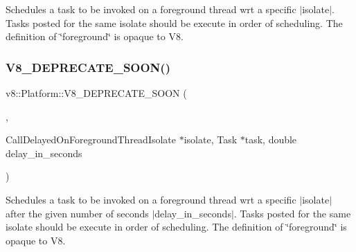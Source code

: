 Schedules a task to be invoked on a foreground thread wrt a specific $\vert$isolate$\vert$. Tasks posted for the same isolate should be execute in order of scheduling. The definition of \char`\"{}foreground\char`\"{} is opaque to V8. \mbox{\label{classv8_1_1Platform_a7bdd7f9f31ce5fe5c5f0fd8a0e597d04}} 
\subsubsection{\texorpdfstring{V8\+\_\+\+D\+E\+P\+R\+E\+C\+A\+T\+E\+\_\+\+S\+O\+O\+N()}{V8\_DEPRECATE\_SOON()}\hspace{0.1cm}{\footnotesize\ttfamily [2/3]}}
{\footnotesize\ttfamily v8\+::\+Platform\+::\+V8\+\_\+\+D\+E\+P\+R\+E\+C\+A\+T\+E\+\_\+\+S\+O\+ON (\begin{DoxyParamCaption}\item[{\char`\"{}Use a taskrunner acquired by \mbox{\hyperlink{classv8_1_1Platform_af0d18c6bbefa133c5d11ec8a460d0278}{Get\+Foreground\+Task\+Runner}} instead.\char`\"{}}]{,  }\item[{virtual void }]{Call\+Delayed\+On\+Foreground\+ThreadIsolate $\ast$isolate, Task $\ast$task, double delay\+\_\+in\+\_\+seconds }\end{DoxyParamCaption})\hspace{0.3cm}{\ttfamily [pure virtual]}}

Schedules a task to be invoked on a foreground thread wrt a specific $\vert$isolate$\vert$ after the given number of seconds $\vert$delay\+\_\+in\+\_\+seconds$\vert$. Tasks posted for the same isolate should be execute in order of scheduling. The definition of \char`\"{}foreground\char`\"{} is opaque to V8. \mbox{\label{classv8_1_1Platform_a2164bf101f39010ec95e117a69a4e782}} 
